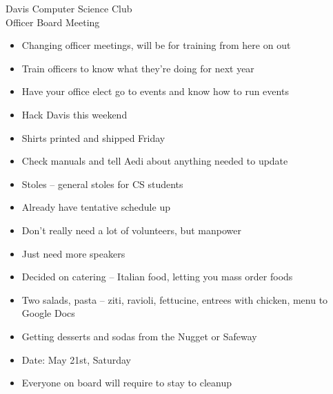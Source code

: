 \documentclass{article}
\begin{document}
\begin{Minutes}{Davis Computer Science Club\\Officer Board Meeting}




\maketitle

\begin{itemize}
\item Changing officer meetings, will be for training from here on out
\item Train officers to know what they're doing for next year
\item Have your office elect go to events and know how to run events
\item Hack Davis this weekend 
\item Shirts printed and shipped Friday
\item Check manuals and tell Aedi about anything needed to update
\item Stoles -- general stoles for CS students 
\end{itemize}

\begin {itemize}
\item Already have tentative schedule up
\item Don't really need a lot of volunteers, but manpower
\item Just need more speakers
\end {itemize}

\begin{itemize}
\item Decided on catering -- Italian food, letting you mass order foods
\item Two salads, pasta -- ziti, ravioli, fettucine, entrees with chicken, menu to Google Docs 
\item Getting desserts and sodas from the Nugget or Safeway
\item Date: May 21st, Saturday   
\item Everyone on board will require to stay to cleanup 
\end{itemize}


\end{Minutes}
\end{document}
